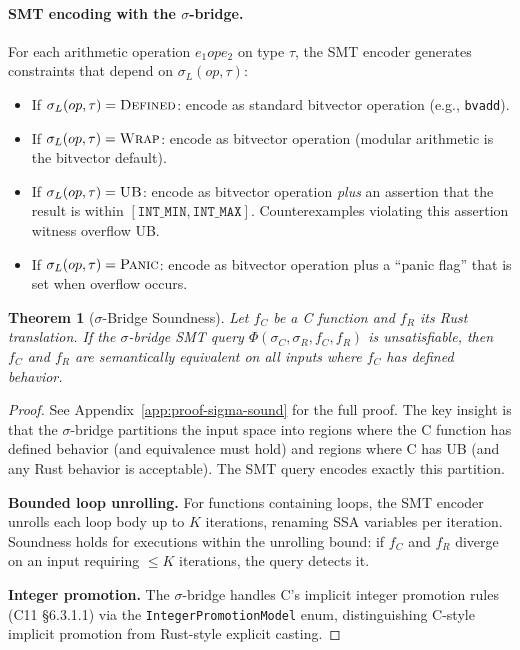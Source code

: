 \documentclass[11pt,a4paper]{article}
\newtheorem{theorem}{Theorem}
\begin{document}
\paragraph{SMT encoding with the $\sigma$-bridge.}
For each arithmetic operation $e_1 \mathbin{op} e_2$ on type $\tau$,
the SMT encoder generates constraints that depend on
$\sigma_L(op, \tau)$:

\begin{itemize}
\item If $\sigma_L(op, \tau) = \textsc{Defined}$: encode as standard
  bitvector operation (e.g., \texttt{bvadd}).
\item If $\sigma_L(op, \tau) = \textsc{Wrap}$: encode as bitvector
  operation (modular arithmetic is the bitvector default).
\item If $\sigma_L(op, \tau) = \textsc{UB}$: encode as bitvector
  operation \emph{plus} an assertion that the result is within
  $[\texttt{INT\_MIN}, \texttt{INT\_MAX}]$.  Counterexamples
  violating this assertion witness overflow UB.
\item If $\sigma_L(op, \tau) = \textsc{Panic}$: encode as bitvector
  operation plus a ``panic flag'' that is set when overflow occurs.
\end{itemize}

\begin{theorem}[$\sigma$-Bridge Soundness]\label{thm:sigma-sound}
Let $f_C$ be a C function and $f_R$ its Rust translation.  If the
$\sigma$-bridge SMT query $\Phi(\sigma_C, \sigma_R, f_C, f_R)$ is
unsatisfiable, then $f_C$ and $f_R$ are semantically equivalent on all
inputs where $f_C$ has defined behavior.
\end{theorem}

\begin{proof}
See Appendix~\ref{app:proof-sigma-sound} for the full proof.  The key
insight is that the $\sigma$-bridge partitions the input space into
regions where the C function has defined behavior (and equivalence must
hold) and regions where C has UB (and any Rust behavior is acceptable).
The SMT query encodes exactly this partition.

\textbf{Bounded loop unrolling.}  For functions containing loops, the
SMT encoder unrolls each loop body up to $K$ iterations, renaming SSA
variables per iteration.  Soundness holds for executions within the
unrolling bound: if $f_C$ and $f_R$ diverge on an input requiring
$\leq K$ iterations, the query detects it.

\textbf{Integer promotion.}  The $\sigma$-bridge handles C's implicit
integer promotion rules (C11 \S6.3.1.1) via the
\texttt{IntegerPromotionModel} enum, distinguishing C-style implicit
promotion from Rust-style explicit casting.
\end{proof}
\end{document}
